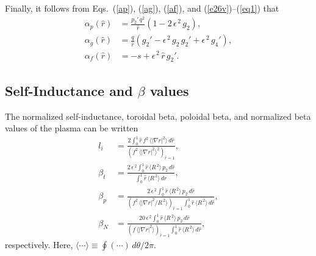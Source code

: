 \documentclass[12pt,prb,aps]{revtex4-1}
\begin{document}
Finally, it follows from Eqs.~(\ref{ap}), (\ref{ag}), (\ref{af}), and (\ref{e26v})--(\ref{eq1}) that
\begin{align}
\alpha_p(\hat{r}) &= \frac{p_2'\,q^2}{\hat{r}}\left(1-2\,\epsilon^{\,2}\,g_2\right),\\[0.5ex]
\alpha_g(\hat{r}) &= \frac{q}{\hat{r}}\left(g_2' -\epsilon^{\,2}\,g_2\,g_2'+\epsilon^{\,2}\,g_4'\right),\\[0.5ex]
\alpha_f(\hat{r}) &= -s + \epsilon^{\,2}\,\hat{r}\,g_2'.
\end{align}

\subsection{Self-Inductance and $\beta$ values}
The normalized self-inductance, toroidal beta, poloidal beta, and normalized beta values of the plasma
can be written\,\cite{gs1}
\begin{align}
l_i&= \frac{2\int_0^1 \hat{r}\,f^2\,\langle |\nabla r|^2\rangle\,d\hat{r}}{(f^2\,\langle|\nabla r|^2\rangle^2)_{\hat{r}=1}},\\[0.5ex]
\beta_t &=  \frac{2\,\epsilon^{\,2}\int_0^1 \hat{r}\,\langle R^{\,2}\rangle\,p_2\,d\hat{r}}{\int_0^1 \hat{r}\,\langle R^{\,2}\rangle\,d\hat{r}},\\[0.5ex]
\beta_p &=  \frac{2\,\epsilon^{\,2}\int_0^1 \hat{r}\,\langle R^{\,2}\rangle\,p_2\,d\hat{r}}
{(f^2\,\langle|\nabla r|^2/R^{\,2}\rangle)_{\hat{r}=1}\int_0^1 \hat{r}\,\langle R^{\,2}\rangle\,d\hat{r}},\\[0.5ex]
\beta_N &=  \frac{20\,\epsilon^{\,2}\int_0^1 \hat{r}\,\langle R^{\,2}\rangle\,p_2\,d\hat{r}}
{(f\,\langle|\nabla r|^2\rangle)_{\hat{r}=1}\int_0^1 \hat{r}\,\langle R^{\,2}\rangle\,d\hat{r}},
\end{align}
respectively. Here, $\langle\cdots\rangle \equiv \oint (\cdots)\,d\theta/2\pi$.
\end{document}
